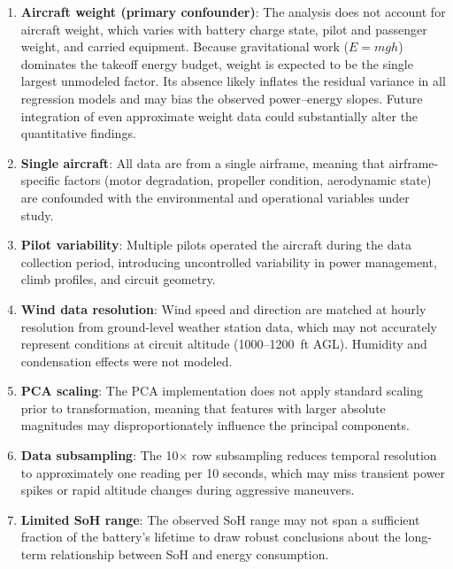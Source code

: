 \documentclass[11pt,a4paper]{article}
\begin{document}
\begin{enumerate}
    \item \textbf{Aircraft weight (primary confounder)}: The analysis does not account for aircraft weight, which varies with battery charge state, pilot and passenger weight, and carried equipment. Because gravitational work ($E = mgh$) dominates the takeoff energy budget, weight is expected to be the single largest unmodeled factor. Its absence likely inflates the residual variance in all regression models and may bias the observed power--energy slopes. Future integration of even approximate weight data could substantially alter the quantitative findings.

    \item \textbf{Single aircraft}: All data are from a single airframe, meaning that airframe-specific factors (motor degradation, propeller condition, aerodynamic state) are confounded with the environmental and operational variables under study.

    \item \textbf{Pilot variability}: Multiple pilots operated the aircraft during the data collection period, introducing uncontrolled variability in power management, climb profiles, and circuit geometry.

    \item \textbf{Wind data resolution}: Wind speed and direction are matched at hourly resolution from ground-level weather station data, which may not accurately represent conditions at circuit altitude (1000--1200~ft AGL). Humidity and condensation effects were not modeled.

    \item \textbf{PCA scaling}: The PCA implementation does not apply standard scaling prior to transformation, meaning that features with larger absolute magnitudes may disproportionately influence the principal components.

    \item \textbf{Data subsampling}: The 10$\times$ row subsampling reduces temporal resolution to approximately one reading per 10 seconds, which may miss transient power spikes or rapid altitude changes during aggressive maneuvers.

    \item \textbf{Limited SoH range}: The observed SoH range may not span a sufficient fraction of the battery's lifetime to draw robust conclusions about the long-term relationship between SoH and energy consumption.


\end{enumerate}
\end{document}
